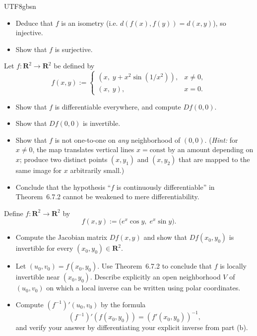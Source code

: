 \documentclass[addpoints]{exam}
\theoremstyle{definition}
\begin{document}
\begin{CJK*}{UTF8}{gbsn}
\begin{questions}
\begin{itemize}
\item[(4)] Deduce that \(f\) is an isometry (i.e. $d(f(x),f(y))=d(x,y)$), so injective.

\item[(5)] Show that \(f\) is surjective.
\end{itemize}

\begin{solution}

\end{solution}

\question Let $f:\mathbf{R}^2\to\mathbf{R}^2$ be defined by
\[
f(x,y):=
\begin{cases}
(x,\; y + x^2\sin(1/x^2)), & x\neq 0,\\
(x,\; y), & x=0.
\end{cases}
\]
\begin{itemize}
\item[(a)] Show that $f$ is differentiable everywhere, and compute $Df(0,0)$.
\item[(b)] Show that $Df(0,0)$ is invertible.
\item[(c)] Show that $f$ is not one-to-one on \emph{any} neighborhood of $(0,0)$.
(\emph{Hint:} for $x\neq 0$, the map translates vertical lines $x=\text{const}$ by an amount depending on $x$; produce two distinct points $(x,y_1)$ and $(x,y_2)$ that are mapped to the same image for $x$ arbitrarily small.)
\item[(d)] Conclude that the hypothesis ``$f$ is continuously differentiable'' in Theorem~6.7.2 cannot be weakened to mere differentiability.
\end{itemize}

\question
Define $f:\mathbf{R}^2\to\mathbf{R}^2$ by
\[
f(x,y):=\bigl(e^x\cos y,\; e^x\sin y\bigr).
\]
\begin{itemize}
\item[(a)] Compute the Jacobian matrix $Df(x,y)$ and show that $Df(x_0,y_0)$ is invertible for every $(x_0,y_0)\in\mathbf{R}^2$.
\item[(b)] Let $(u_0,v_0)=f(x_0,y_0)$.  Use Theorem~6.7.2 to conclude that $f$ is locally invertible near $(x_0,y_0)$.
Describe explicitly an open neighborhood $V$ of $(u_0,v_0)$ on which a local inverse can be written using polar coordinates.
\item[(c)] Compute $(f^{-1})'(u_0,v_0)$ by the formula
\[
(f^{-1})'(f(x_0,y_0))=(f'(x_0,y_0))^{-1},
\]
and verify your answer by differentiating your explicit inverse from part (b).
\end{itemize}


\end{questions}
\end{CJK*}
\end{document}
